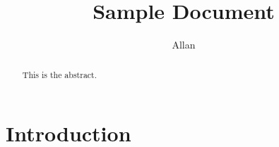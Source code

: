 \documentclass[12pt]{amsart}
\begin{document}
\title{Sample Document}
\author{Allan}
\begin{abstract}
This is the abstract.
\end{abstract}
\maketitle

\section{Introduction}
\end{document}
